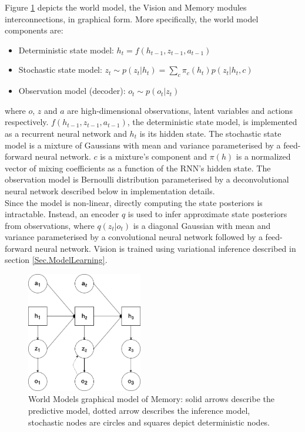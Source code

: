 Figure \ref{Fig.WorldModelsPGM} depicts the world model, the Vision and Memory modules interconnections, in graphical form. More specifically, the world model components are:
\begin{itemize}
\item Deterministic state model:             $h_t = f(h_{t-1}, z_{t-1}, a_{t-1})$
\item Stochastic state model:                $z_t \sim p(z_t|h_t) = \sum_c\pi_c(h_t)p(z_t|h_t, c)$
\item Observation model (decoder):           $o_t \sim p(o_t|z_t)$
\end{itemize}
where $o$, $z$ and $a$ are high-dimensional observations, latent variables and actions respectively. $f(h_{t-1}, z_{t-1}, a_{t-1})$, the deterministic state model, is implemented as a recurrent neural network and $h_t$ is its hidden state. The stochastic state model is a mixture of Gaussians with mean and variance parameterised by a feed-forward neural network. $c$ is a mixture's component and $\pi(h)$ is a normalized vector of mixing coefficients as a function of the RNN's hidden state. The observation model is Bernoulli distribution parameterised by a deconvolutional neural network described below in implementation details. \\
Since the model is non-linear, directly computing the state posteriors is intractable. Instead, an encoder $q$ is used to infer approximate state posteriors from observations, where $q(z_t | o_t)$ is a diagonal Gaussian with mean and variance parameterised by a convolutional neural network followed by a feed-forward neural network. Vision is trained using variational inference described in section \ref{Sec.ModelLearning}.

\begin{figure}[H]
\includegraphics[width=0.45\textwidth,keepaspectratio]{figures/WorldModels/prob_graph_model.png}
\caption[World Models graphical model of Memory]{World Models graphical model of Memory: solid arrows describe the predictive model, dotted arrow describes the inference model, stochastic nodes are circles and squares depict deterministic nodes.}
\label{Fig.WorldModelsPGM}
\end{figure}

